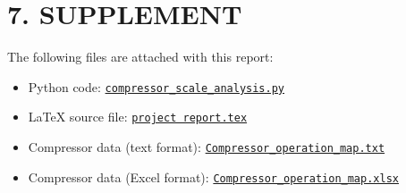 \documentclass[12pt]{article}
\begin{document}
\section*{\large{7. SUPPLEMENT}}
The following files are attached with this report:
\begin{itemize}
    \item Python code: \href{https://github.com/Navnit1294/ME_302_Course_Project/edit/main/compressor_map.py#L23C0}{\texttt{compressor\_scale\_analysis.py}}
    \item LaTeX source file: \href{}{\texttt{project report.tex}}
    \item Compressor data (text format): \href{https://github.com/Navnit1294/ME_302_Course_Project/blob/main/Compressor_operation_map.txt}{\texttt{Compressor\_operation\_map.txt}}
    \item Compressor data (Excel format): \href{https://github.com/Navnit1294/ME_302_Course_Project/blob/main/Compressor_operation_map.xlsx}{\texttt{Compressor\_operation\_map.xlsx}}
\end{itemize}
\end{document}
